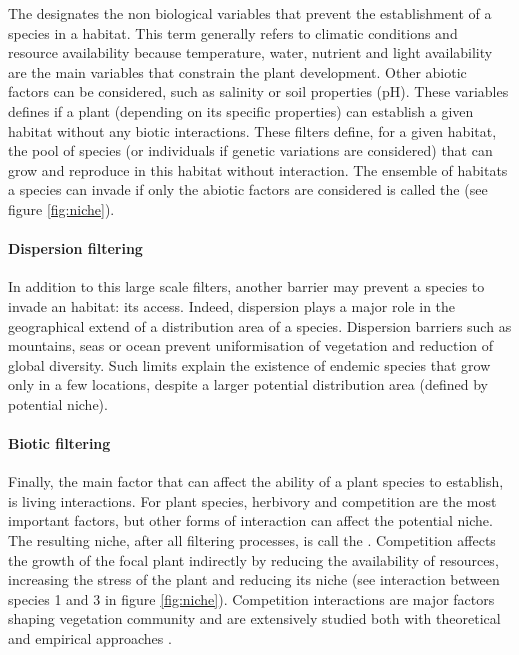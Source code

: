 The  designates the non biological variables that prevent the establishment of a species in a habitat. This term generally refers to climatic conditions and resource availability because temperature, water, nutrient and light availability are the main variables that constrain the plant development. Other abiotic factors can be considered, such as salinity \cite{poorter_leaf_2006} or soil properties (pH). These variables defines if a plant (depending on its specific properties) can establish a given habitat without any biotic interactions. These filters define, for a given habitat, the pool of species (or individuals if genetic variations are considered) that can grow and reproduce in this habitat without interaction. The ensemble of habitats a species can invade if only the abiotic factors are considered is called the  (see figure \ref{fig:niche}). 

\paragraph{Dispersion filtering}

In addition to this large scale filters, another barrier may prevent a species to invade an habitat: its access. Indeed, dispersion plays a major role in the geographical extend of a distribution area of a species. Dispersion barriers such as mountains, seas or ocean prevent uniformisation of vegetation and reduction of global diversity. Such limits explain the existence of endemic species that grow only in a few locations, despite a larger potential distribution area (defined by potential niche).




\paragraph{Biotic filtering}

Finally, the main factor that can affect the ability of a plant species to establish, is living interactions. For plant species, herbivory and competition are the most important factors, but other forms of interaction can affect the potential niche. The resulting niche, after all filtering processes, is call the . Competition affects the growth of the focal plant indirectly by reducing the availability of resources, increasing the stress of the plant and reducing its niche (see interaction between species 1 and 3 in figure \ref{fig:niche}). Competition interactions are major factors shaping vegetation community and are extensively studied both with theoretical \parencite{chesson_general_2000, amarasekare_competitive_2003} and empirical approaches \parencite{kunstler_plant_2016}.

